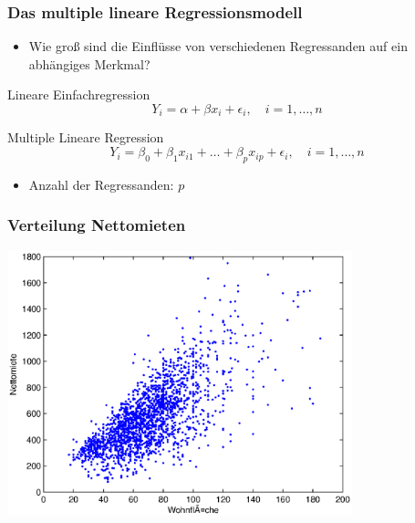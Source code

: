 \documentclass{beamer}
\begin{document}
\begin{frame}
 \frametitle{Das multiple lineare Regressionsmodell}

 \begin{itemize}
  \item Wie groß sind die Einflüsse von verschiedenen Regressanden auf ein abhängiges Merkmal?
 \end{itemize}
 
 \begin{block}{Lineare Einfachregression}
  \begin{equation*}
   Y_i = \alpha + \beta x_i + \epsilon_i, \quad i = 1, \dots, n
  \end{equation*}
 \end{block}

 \begin{block}{Multiple Lineare Regression}
  \begin{equation*}
   Y_i = \beta_0 + \beta_1 x_{i1} + \dots + \beta_p x_{ip} + \epsilon_i, \quad i = 1, \dots, n
  \end{equation*}
  \begin{itemize}
   \item Anzahl der Regressanden: $p$
  \end{itemize}

 \end{block}

\end{frame}

\begin{frame}
  \frametitle{Verteilung Nettomieten}
  \begin{center}
    \includegraphics[width=10cm]{figures/nm_wfl_distribution}
  \end{center}
\end{frame}
\end{document}
